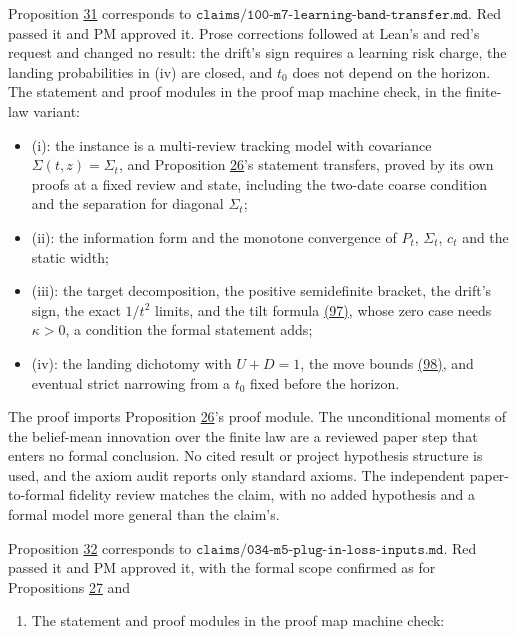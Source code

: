 \documentclass[11pt]{article}
\begin{document}
Proposition \hyperref[res:Proposition-31]{31} corresponds to
\(\texttt{claims/100-m7-learning-band-transfer.md}\). Red passed it
and PM approved it. Prose corrections followed at Lean's and red's
request and changed no result: the drift's sign requires a learning
risk charge, the landing probabilities in (iv) are closed, and \(t_0\)
does not depend on the horizon. The statement and proof modules in the proof map machine
check, in the finite-law variant:

\begin{itemize}
  \item (i): the instance is a multi-review tracking model with covariance
  \(\Sigma(t,z)=\Sigma_t\), and Proposition \hyperref[res:Proposition-26]{26}'s statement transfers, proved by
  its own proofs at a fixed review and state, including the two-date
  coarse condition and the separation for diagonal \(\Sigma_t\);
  \item (ii): the information form and the monotone convergence of \(P_t\),
  \(\Sigma_t\), \(c_t\) and the static width;
  \item (iii): the target decomposition, the positive semidefinite bracket,
  the drift's sign, the exact \(1/t^2\) limits, and the tilt formula
  \hyperref[eq:97]{(97)}, whose zero case needs \(\kappa>0\), a condition the formal
  statement adds;
  \item (iv): the landing dichotomy with \(U+D=1\), the move bounds \hyperref[eq:98]{(98)}, and
  eventual strict narrowing from a \(t_0\) fixed before the horizon.
\end{itemize}

The proof imports Proposition \hyperref[res:Proposition-26]{26}'s proof module. The unconditional
moments of the belief-mean innovation over the finite law are a
reviewed paper step that enters no formal conclusion. No cited result
or project hypothesis structure is used, and the axiom audit reports
only standard axioms. The independent paper-to-formal fidelity
review matches the claim, with no added hypothesis and a formal model
more general than the claim's.

Proposition \hyperref[res:Proposition-32]{32} corresponds to
\(\texttt{claims/034-m5-plug-in-loss-inputs.md}\). Red passed it and PM
approved it, with the formal scope confirmed as for Propositions \hyperref[res:Proposition-27]{27} and

\begin{enumerate}
  \item The statement and proof modules in the proof map machine check:
\end{enumerate}
\end{document}
